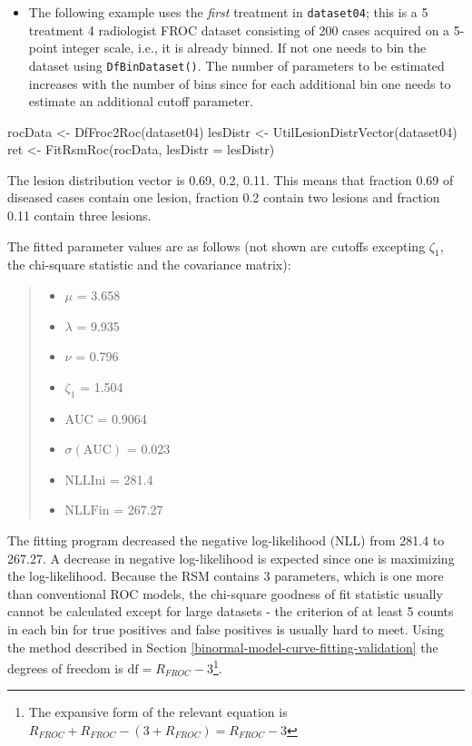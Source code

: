 \documentclass[
]{book}
\newenvironment{Shaded}{\begin{snugshade}}{\end{snugshade}}
\newcommand{\AttributeTok}[1]{\textcolor[rgb]{0.77,0.63,0.00}{#1}}
\newcommand{\FunctionTok}[1]{\textcolor[rgb]{0.00,0.00,0.00}{#1}}
\newcommand{\NormalTok}[1]{#1}
\newcommand{\OtherTok}[1]{\textcolor[rgb]{0.56,0.35,0.01}{#1}}
\providecommand{\tightlist}{%
  \setlength{\itemsep}{0pt}\setlength{\parskip}{0pt}}
\begin{document}
\begin{itemize}
\tightlist
\item
  The following example uses the \emph{first} treatment in \texttt{dataset04}; this is a 5 treatment 4 radiologist FROC dataset \citep{zanca2009evaluation} consisting of 200 cases acquired on a 5-point integer scale, i.e., it is already binned. If not one needs to bin the dataset using \texttt{DfBinDataset()}. The number of parameters to be estimated increases with the number of bins since for each additional bin one needs to estimate an additional cutoff parameter.
\end{itemize}

\begin{Shaded}
\begin{Highlighting}[]
\NormalTok{rocData }\OtherTok{\textless{}{-}} \FunctionTok{DfFroc2Roc}\NormalTok{(dataset04)}
\NormalTok{lesDistr }\OtherTok{\textless{}{-}} \FunctionTok{UtilLesionDistrVector}\NormalTok{(dataset04)}
\NormalTok{ret }\OtherTok{\textless{}{-}} \FunctionTok{FitRsmRoc}\NormalTok{(rocData, }\AttributeTok{lesDistr =}\NormalTok{ lesDistr)}
\end{Highlighting}
\end{Shaded}

The lesion distribution vector is 0.69, 0.2, 0.11. This means that fraction 0.69 of diseased cases contain one lesion, fraction 0.2 contain two lesions and fraction 0.11 contain three lesions.

The fitted parameter values are as follows (not shown are cutoffs excepting \(\zeta_1\), the chi-square statistic and the covariance matrix):

\begin{quote}
\begin{itemize}
\tightlist
\item
  \(\mu\) = 3.658
\item
  \(\lambda\) = 9.935
\item
  \(\nu\) = 0.796
\item
  \(\zeta_1\) = 1.504
\item
  \(\text{AUC}\) = 0.9064
\item
  \(\sigma (\text{AUC})\) = 0.023
\item
  \(\text{NLLIni}\) = 281.4
\item
  \(\text{NLLFin}\) = 267.27
\end{itemize}
\end{quote}

The fitting program decreased the negative log-likelihood (NLL) from 281.4 to 267.27. A decrease in negative log-likelihood is expected since one is maximizing the log-likelihood. Because the RSM contains 3 parameters, which is one more than conventional ROC models, the chi-square goodness of fit statistic usually cannot be calculated except for large datasets - the criterion of at least 5 counts in each bin for true positives and false positives is usually hard to meet. Using the method described in Section \ref{binormal-model-curve-fitting-validation} the degrees of freedom is \(\text{df} = R_{FROC} - 3\)\footnote{The expansive form of the relevant equation is \(R_{FROC} + R_{FROC} - (3 + R_{FROC}) = R_{FROC} - 3\)}.
\end{document}
